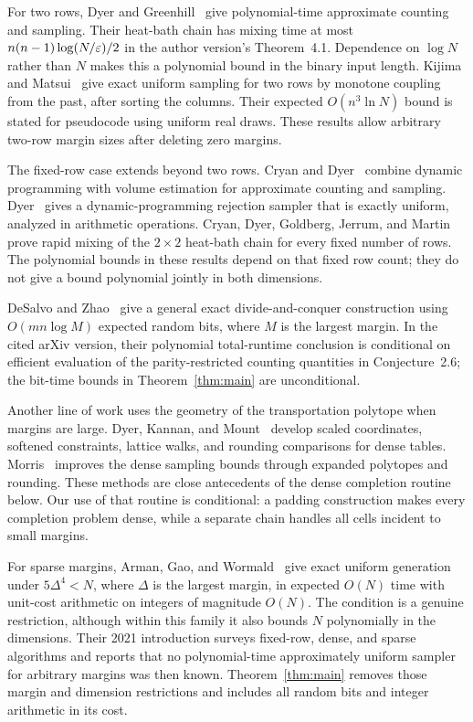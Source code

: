 For two rows, Dyer and Greenhill~\cite{DyerGreenhill2000} give polynomial-time
approximate counting and sampling. Their heat-bath chain has mixing time
at most $n(n-1)\log(N/\varepsilon)/2$ in the author version's Theorem~4.1.
Dependence on $\log N$ rather than $N$ makes this a polynomial bound in
the binary input length.
Kijima and Matsui~\cite[Theorems~3.1 and~5.1]{KM2003} give exact uniform
sampling for two rows by monotone coupling from the past, after sorting
the columns. Their expected $O(n^3\ln N)$ bound is stated for pseudocode
using uniform real draws. These results allow arbitrary two-row margin
sizes after deleting zero margins.

The fixed-row case extends beyond two rows. Cryan and
Dyer~\cite{CD2003} combine dynamic programming with volume estimation for
approximate counting and sampling. Dyer~\cite[Section~3]{Dyer2003} gives a
dynamic-programming rejection sampler that is exactly uniform, analyzed
in arithmetic operations. Cryan, Dyer, Goldberg,
Jerrum, and Martin~\cite{CDGJM2006} prove rapid mixing of the
$2\times2$ heat-bath chain for every fixed number of rows.
The polynomial bounds in these results depend on that fixed row count;
they do not give a bound polynomial jointly in both dimensions.

DeSalvo and Zhao~\cite[Theorem~2.3 and Remarks~2.4--2.5]{DZ2016} give a
general exact divide-and-conquer construction using $O(mn\log M)$ expected
random bits, where $M$ is the largest margin. In the cited arXiv version,
their polynomial total-runtime conclusion is conditional on efficient
evaluation of the parity-restricted counting quantities in Conjecture~2.6;
the bit-time bounds in Theorem~\ref{thm:main} are unconditional.

Another line of work uses the geometry of the transportation polytope
when margins are large. Dyer, Kannan, and Mount~\cite{DKM1997} develop
scaled coordinates, softened constraints, lattice walks, and rounding
comparisons for dense tables. Morris~\cite{Morris2002} improves the dense
sampling bounds through expanded polytopes and rounding. These methods
are close antecedents of the dense completion routine below. Our use of
that routine is conditional: a padding construction makes every
completion problem dense, while a separate chain handles all cells
incident to small margins.

For sparse margins, Arman, Gao, and Wormald~\cite[Theorem~1 and
Remark~2]{AGW2021} give exact uniform generation under $5\Delta^4<N$,
where $\Delta$ is the largest margin, in expected $O(N)$ time with
unit-cost arithmetic on integers of magnitude $O(N)$. The condition is
a genuine restriction, although within this family it also bounds $N$
polynomially in the dimensions. Their 2021 introduction surveys fixed-row,
dense, and sparse algorithms and reports that no polynomial-time
approximately uniform sampler for arbitrary margins was then known.
Theorem~\ref{thm:main} removes those margin and dimension restrictions
and includes all random bits and integer arithmetic in its cost.

